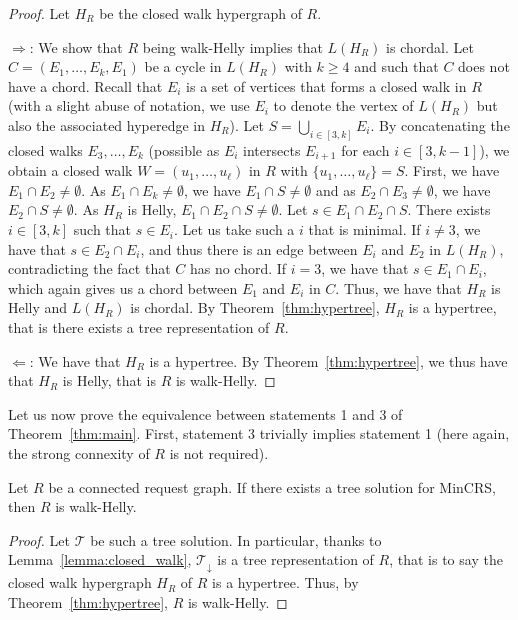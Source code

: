 \documentclass[11pt]{article}%
\begin{document}
\begin{proof}
Let $H_R$ be the closed walk hypergraph of $R$. 

$\Rightarrow$: We show that $R$ being walk-Helly implies that $L(H_R)$ is chordal. Let $C=(E_1,\dots,E_k,E_1)$ be a cycle in $L(H_R)$ with $k\geq 4$ and such that $C$ does not have a chord. Recall that $E_i$ is a set of vertices that forms a closed walk in $R$ (with a slight abuse of notation, we use $E_i$ to denote the vertex of $L(H_R)$ but also the associated hyperedge in $H_R$). Let $S=\bigcup_{i\in [3,k]} E_i$. By concatenating the closed walks $E_3,\dots,E_k$ (possible as $E_i$ intersects $E_{i+1}$ for each $i\in [3,k-1]$), we obtain a closed walk $W=(u_1,\dots,u_\ell)$ in $R$ with $\{u_1,\dots,u_\ell\}=S$. First, we have $E_1\cap E_2\neq \emptyset$. As $E_1\cap E_k\neq \emptyset$, we have $E_1\cap S\neq \emptyset$ and as $E_2\cap E_3\neq \emptyset$, we have $E_2\cap S\neq \emptyset$. As $H_R$ is Helly, $E_1\cap E_2\cap S \neq \emptyset$. Let $s\in E_1\cap E_2\cap S$. There exists $i\in [3,k]$ such that $s\in E_i$. %
Let us take such a $i$ that is minimal. If $i\neq 3$, we have that $s\in E_2\cap E_i$, and thus there is an edge between $E_i$ and $E_2$ in $L(H_R)$, contradicting the fact that $C$ has no chord. If $i=3$, we have that $s\in E_1\cap E_i$, which again gives us a chord between $E_1$ and $E_i$ in $C$. Thus, we have that $H_R$ is Helly and $L(H_R)$ is chordal. By Theorem~\ref{thm:hypertree}, $H_R$ is a hypertree, that is there exists a tree representation of $R$.  

$\Leftarrow$: We have that $H_R$ is a hypertree. By Theorem~\ref{thm:hypertree}, we thus have that $H_R$ is Helly, that is $R$ is walk-Helly. 
\end{proof}


Let us now prove the equivalence between statements 1 and 3 of Theorem~\ref{thm:main}. First, statement 3 trivially implies statement 1 (here again, the strong connexity of $R$ is not required). 

\begin{proposition}
\label{prop:3-1}
Let $R$ be a connected request graph. If there exists a tree solution for MinCRS, then $R$ is walk-Helly.
\end{proposition}

\begin{proof}
Let $\mathcal{T}$ be such a tree solution. In particular, thanks to Lemma~\ref{lemma:closed_walk}, $\mathcal{T}_\downarrow$ is a tree representation of $R$, that is to say the closed walk hypergraph $H_R$ of $R$ is a hypertree. Thus, by Theorem~\ref{thm:hypertree}, $R$ is walk-Helly. 
\end{proof}
\end{document}
